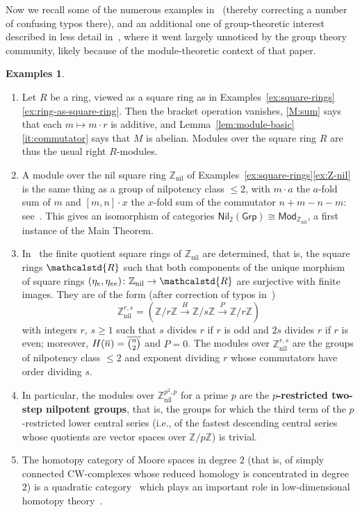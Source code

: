 \documentclass[reqno,a4paper]{amsart}
\renewcommand{\binom}{\tbinom} %
\theoremstyle{plain}
\theoremstyle{definition}
\newtheorem{examples}[subsection]{Examples}
\newcommand{\defn}{\textbf}
\newcommand{\R}{\ensuremath{\mathcalstd{R}}}
\newcommand{\Z}{\ensuremath{\mathbb{Z}}}
\newcommand{\Grp}{\ensuremath{\mathsf{Grp}}}
\newcommand{\Mod}{\ensuremath{\mathsf{Mod}}}
\newcommand{\Nil}{\ensuremath{\mathsf{Nil}}}
\DeclareMathOperator{\nil}{nil}
\newcommand{\sqring}[4]{\ensuremath{(#1\xrightarrow{#3}#2\xrightarrow{#4}#1)}}
\newcommand{\brk}[2]{\ensuremath{[#1,#2]}}
\begin{document}
Now we recall some of the numerous examples in~\cite{BHP} (thereby correcting a number of confusing typos there), and an additional one of group-theoretic interest described in less detail in~\cite{P2RM}, where it went largely unnoticed by the group theory community, likely because of the module-theoretic context of that paper.

\begin{examples}\label{ex:modules}
  \begin{enumerate}
    \item\label{ex:module-over-ring} Let \(R\) be a ring, viewed as a square ring as in Examples~\ref{ex:square-rings}\ref{ex:ring-as-square-ring}. Then the bracket operation vanishes, \ref{M:sum} says that each \(m\mapsto m\cdot r\) is additive, and Lemma~\ref{lem:module-basic}\ref{it:commutator} says that \(M\) is abelian. Modules over the square ring \(R\) are thus the usual right \(R\)-modules.
    \item\label{ex:module-Z-nil} A module over the nil square ring \(\Z_{\nil}\) of Examples~\ref{ex:square-rings}\ref{ex:Z-nil} is the same thing as a group of nilpotency class \(\leq 2\), with \(m\cdot a\) the \(a\)-fold sum of \(m\) and \(\brk{m}{n}\cdot x\) the \(x\)-fold sum of the commutator \(n+m-n-m\): see~\cite[Example~7.9]{BHP}. This gives an isomorphism of categories \(\Nil_{2}(\Grp)\cong\Mod_{\Z_{\nil}}\), a first instance of the Main Theorem.
    \item\label{ex:quotients-of-Z-nil} In~\cite[Subsection~8.1]{BHP} the finite quotient square rings of \(\Z_{\nil}\) are determined, that is, the square rings \(\R\) such that both components of the unique morphism of square rings \((\eta_{e},\eta_{ee})\colon \Z_{\nil}\to\R\) are surjective with finite images. They are of the form (after correction of typos in~\cite{BHP})
          \[
            \Z_{\nil}^{r,s}=\sqring{\Z/r\Z}{\Z/s\Z}{H}{P}
          \]
          with integers \(r\), \(s\geq 1\) such that \(s\) divides \(r\) if \(r\) is odd and \(2s\) divides \(r\) if \(r\) is even; moreover, \(H(\overline{n})=\overline{\binom{n}{2}}\) and \(P=0\). The modules over \(\Z_{\nil}^{r,s}\) are the groups of nilpotency class \(\leq 2\) and exponent dividing \(r\) whose commutators have order dividing \(s\).
    \item\label{ex:p-restricted} In particular, the modules over \(\Z_{\nil}^{p^{2},p}\) for a prime \(p\) are the \defn{\(p\)-restricted two-step nilpotent groups}, that is, the groups for which the third term of the \(p\)-restricted lower central series (i.e., of the fastest descending central series whose quotients are vector spaces over \(\Z/p\Z\)) is trivial.
    \item\label{ex:moore-spaces} The homotopy category of Moore spaces in degree \(2\) (that is, of simply connected CW-complexes whose reduced homology is concentrated in degree \(2\)) is a quadratic category~\cite{BHP} which plays an important role in low-dimensional homotopy theory~\cite{Baues:HomotopyType}.


\end{enumerate}
\end{examples}
\end{document}
